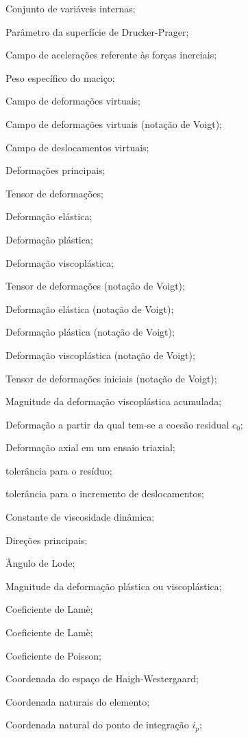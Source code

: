 \item[\textbf{Grego minúsculo:}]
\item[$\alphal$] Conjunto de variáveis internas;
\item[$\beta_1,\beta_2,\beta_3$] Parâmetro da superfície de Drucker-Prager;
\item[$ \gammal $] 		Campo de acelerações referente às forças inerciais;
\item[$\gamma_m$] 		Peso específico do maciço;
\item[$\dvarepsilonll$]		Campo de deformações virtuais;
\item[$\dvarepsilonl$]		Campo de deformações virtuais (notação de Voigt);
\item[$\dul$]		Campo de deslocamentos virtuais;
\item[$\varepsilon_1,\varepsilon_2,\varepsilon_3$] 	Deformações principais;
\item[$ \varepsilonll $] 	Tensor de deformações;
\item[$\varepsilonll^e$] Deformação elástica;
\item[$\varepsilonll^p$] Deformação plástica;
\item[$\varepsilonll^{vp}$] Deformação viscoplástica;
\item[$ \varepsilonl $] 	Tensor de deformações (notação de Voigt);
\item[$\varepsilonl^e$] Deformação elástica (notação de Voigt);
\item[$\varepsilonl^p$] Deformação plástica (notação de Voigt);
\item[$\varepsilonl^{vp}$] Deformação viscoplástica (notação de Voigt);

\item[$ \varepsilonl_0 $] Tensor de deformações iniciais (notação de Voigt);
\item[$\bar{\varepsilon}^{vp}$] Magnitude da deformação viscoplástica acumulada;
\item[$ \varepsilon_0 $] Deformação a partir da qual tem-se a coesão residual $c_0$;
\item[$ \varepsilon_a $] Deformação axial em um ensaio triaxial;
\item[$ \varepsilon_R $] tolerância para o resíduo;
\item[$ \varepsilon_u $] tolerância para o incremento de deslocamentos;

\item[$ \eta $] 		Constante de viscosidade dinâmica;
\item[$\eta_1,\eta_2,\eta_3$] 	Direções principais;
\item[$ \theta $] 		Ângulo de Lode;
\item[$\lambda$] 	Magnitude da deformação plástica ou viscoplástica;
\item[$\lambda^e$] 	Coeficiente de Lamè;
\item[$\mu^e$] 	Coeficiente de Lamè;
\item[$ \nu $] 			Coeficiente de Poisson;
\item[$ \xi_{H} $] 				Coordenada do espaço de Haigh-Westergaard;
\item[$\underline \xi$] 				Coordenada naturais do elemento;
\item[$\xil_{i_p}$] 				Coordenada natural do ponto de integração $i_p$;


